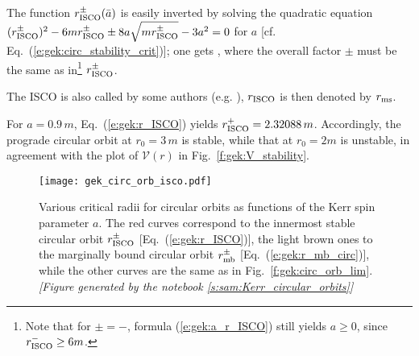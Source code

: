 The function $r_{\rm ISCO}^\pm(\bar{a})$ is easily inverted by solving
the quadratic equation $(r_{\rm ISCO}^\pm)^2 - 6 m r_{\rm ISCO}^\pm \pm 8 a \sqrt{m r_{\rm ISCO}^\pm} - 3 a^2 = 0$ for $a$
[cf. Eq.~(\ref{e:gek:circ_stability_crit})]; one gets
\be \label{e:gek:a_r_ISCO}
      ,
\ee
where the overall factor $\pm$ must be the same as in\footnote{Note that
for $\pm=-$, formula (\ref{e:gek:a_r_ISCO}) still yields $a\geq 0$, since
$r_{\rm ISCO}^- \geq 6 m$.} $r_{\rm ISCO}^\pm$.

\begin{remark}
The ISCO is also called  by some authors (e.g. \cite{BardePT72}), $r_{\rm ISCO}$ is then denoted by $r_{\rm ms}$.
\end{remark}

\begin{example}
For $a = 0.9\, m$, Eq.~(\ref{e:gek:r_ISCO}) yields $r_{\rm ISCO}^+ = 2.32088\, m$. Accordingly,
the prograde circular orbit at $r_0 = 3\, m$ is stable, while that at $r_0 = 2 m$ is unstable,
in agreement with the plot of $\mathcal{V}(r)$ in Fig.~\ref{f:gek:V_stability}.
\end{example}

\begin{figure}
\centerline{\texttt{[image: gek\_circ\_orb\_isco.pdf]}}
\caption[]{\label{f:gek:circ_orb_isco} \footnotesize
Various critical radii for circular orbits as functions of the Kerr spin parameter $a$.
The red curves correspond to the innermost stable circular orbit $r_{\rm ISCO}^\pm$ [Eq.~(\ref{e:gek:r_ISCO})], the light brown ones to the marginally bound circular orbit
$r_{\rm mb}^\pm$ [Eq.~(\ref{e:gek:r_mb_circ})],
while the other curves are the same as in Fig.~\ref{f:gek:circ_orb_lim}.
\textsl{[Figure generated by the notebook \ref{s:sam:Kerr_circular_orbits}]}
}
\end{figure}

